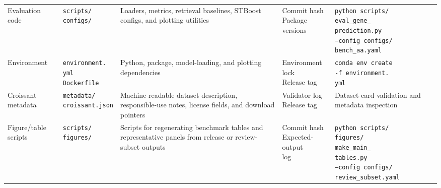 \documentclass[sigconf,review]{acmart}
\begin{document}
\begin{table}[!t]
\begin{tabularx}{\textwidth}{
>{\raggedright\arraybackslash}p{1.75cm}
>{\raggedright\arraybackslash}p{2.15cm}
>{\raggedright\arraybackslash}X
>{\raggedright\arraybackslash}p{2.05cm}
>{\raggedright\arraybackslash}X
}
Evaluation code &
\makecell[l]{\texttt{scripts/}\\
\texttt{configs/}} &
Loaders, metrics, retrieval baselines, STBoost configs, and plotting utilities &
\makecell[l]{Commit hash\\
Package\\
versions} &
\makecell[l]{\texttt{python scripts/}\\
\texttt{eval\_gene\_}\\
\texttt{prediction.py}\\
\texttt{--config configs/}\\
\texttt{bench\_aa.yaml}} \\

Environment &
\makecell[l]{\texttt{environment.}\\
\texttt{yml}\\
\texttt{Dockerfile}} &
Python, package, model-loading, and plotting dependencies &
\makecell[l]{Environment lock\\
Release tag} &
\makecell[l]{\texttt{conda env create}\\
\texttt{-f environment.}\\
\texttt{yml}} \\

Croissant metadata &
\makecell[l]{\texttt{metadata/}\\
\texttt{croissant.json}} &
Machine-readable dataset description, responsible-use notes, license fields, and download pointers &
\makecell[l]{Validator log\\
Release tag} &
Dataset-card validation and metadata inspection \\

Figure/table scripts &
\makecell[l]{\texttt{scripts/}\\
\texttt{figures/}} &
Scripts for regenerating benchmark tables and representative panels from release or review-subset outputs &
\makecell[l]{Commit hash\\
Expected-output\\
log} &
\makecell[l]{\texttt{python scripts/}\\
\texttt{figures/}\\
\texttt{make\_main\_}\\
\texttt{tables.py}\\
\texttt{--config configs/}\\
\texttt{review\_subset.yaml}} \\

\bottomrule
\end{tabularx}
\end{table}
\end{document}

